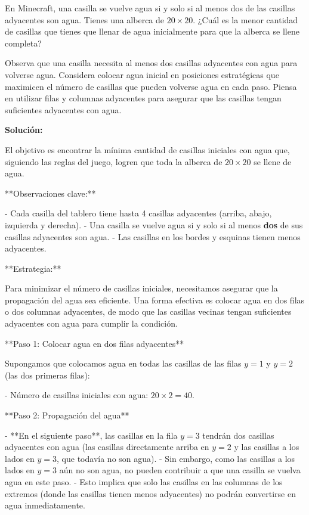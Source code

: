 \documentclass[11pt]{scrartcl}
\begin{document}
\begin{problem}
En Minecraft, una casilla se vuelve agua si y solo si al menos dos de las casillas adyacentes son agua. Tienes una alberca de $20 \times 20$. ¿Cuál es la menor cantidad de casillas que tienes que llenar de agua inicialmente para que la alberca se llene completa?

\begin{hint}
Observa que una casilla necesita al menos dos casillas adyacentes con agua para volverse agua. Considera colocar agua inicial en posiciones estratégicas que maximicen el número de casillas que pueden volverse agua en cada paso. Piensa en utilizar filas y columnas adyacentes para asegurar que las casillas tengan suficientes adyacentes con agua.

\begin{solu}
\textbf{Solución:}

El objetivo es encontrar la mínima cantidad de casillas iniciales con agua que, siguiendo las reglas del juego, logren que toda la alberca de $20 \times 20$ se llene de agua.

**Observaciones clave:**

- Cada casilla del tablero tiene hasta 4 casillas adyacentes (arriba, abajo, izquierda y derecha).
- Una casilla se vuelve agua si y solo si al menos \textbf{dos} de sus casillas adyacentes son agua.
- Las casillas en los bordes y esquinas tienen menos adyacentes.

**Estrategia:**

Para minimizar el número de casillas iniciales, necesitamos asegurar que la propagación del agua sea eficiente. Una forma efectiva es colocar agua en dos filas o dos columnas adyacentes, de modo que las casillas vecinas tengan suficientes adyacentes con agua para cumplir la condición.

**Paso 1: Colocar agua en dos filas adyacentes**

Supongamos que colocamos agua en todas las casillas de las filas $y = 1$ y $y = 2$ (las dos primeras filas):

- Número de casillas iniciales con agua: $20 \times 2 = 40$.

**Paso 2: Propagación del agua**

- **En el siguiente paso**, las casillas en la fila $y = 3$ tendrán dos casillas adyacentes con agua (las casillas directamente arriba en $y = 2$ y las casillas a los lados en $y = 3$, que todavía no son agua).
- Sin embargo, como las casillas a los lados en $y = 3$ aún no son agua, no pueden contribuir a que una casilla se vuelva agua en este paso.
- Esto implica que solo las casillas en las columnas de los extremos (donde las casillas tienen menos adyacentes) no podrán convertirse en agua inmediatamente.


\end{solu}
\end{hint}
\end{problem}
\end{document}
